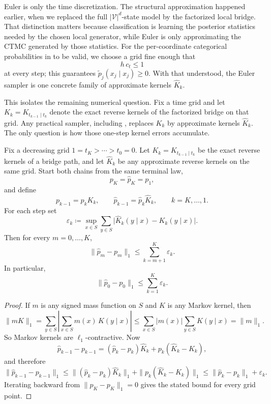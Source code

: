 \documentclass[11pt]{article}
\begin{document}
Euler is only the time discretization.
The structural approximation happened earlier, when we replaced the full \(|\mathcal{V}|^d\)-state model by the factorized local bridge.
That distinction matters because classification is learning the posterior statistics needed by the chosen local generator, while Euler is only approximating the CTMC generated by those statistics.
For the per-coordinate categorical probabilities in  to be valid, we choose a grid fine enough that
\[
  h\,c_t\le 1
\]
at every step; this guarantees \(\tilde p_j(x_j\mid x_j)\ge 0\).
With that understood, the Euler sampler is one concrete family of approximate kernels \(\hat K_k\).

This isolates the remaining numerical question.
Fix a time grid and let \(K_k=K_{t_{k-1}\mid t_k}\) denote the exact reverse kernels of the factorized bridge on that grid.
Any practical sampler, including , replaces \(K_k\) by approximate kernels \(\hat K_k\).
The only question is how those one-step kernel errors accumulate.

\begin{proposition}
\label{prop:accumulated-kernel-error}
Fix a decreasing grid \(1=t_K>\cdots>t_0=0\).
Let \(K_k=K_{t_{k-1}\mid t_k}\) be the exact reverse kernels of a bridge path, and let \(\hat K_k\) be any approximate reverse kernels on the same grid.
Start both chains from the same terminal law,
\[
  p_K=\hat p_K=p_1,
\]
and define
\[
  p_{k-1}=p_k K_k,
  \qquad
  \hat p_{k-1}=\hat p_k \hat K_k,
  \qquad k=K,\dots,1.
\]
For each step set
\[
  \varepsilon_k
  \coloneqq
  \sup_{x\in S}
  \sum_{y\in S}
  \bigl|\hat K_k(y\mid x)-K_k(y\mid x)\bigr|.
\]
Then for every \(m=0,\dots,K\),
\[
  \|\hat p_m-p_m\|_1
  \le
  \sum_{k=m+1}^K \varepsilon_k.
\]
In particular,
\[
  \|\hat p_0-p_0\|_1
  \le
  \sum_{k=1}^K \varepsilon_k.
\]
\end{proposition}
\begin{proof}
If \(m\) is any signed mass function on \(S\) and \(K\) is any Markov kernel, then
\[
  \|mK\|_1
  =
  \sum_{y\in S}
  \left|\sum_{x\in S} m(x)\,K(y\mid x)\right|
  \le
  \sum_{x\in S}|m(x)|\sum_{y\in S}K(y\mid x)
  =
  \|m\|_1.
\]
So Markov kernels are \(\ell_1\)-contractive.
Now
\[
  \hat p_{k-1}-p_{k-1}
  =
  (\hat p_k-p_k)\hat K_k
  +
  p_k(\hat K_k-K_k),
\]
and therefore
\[
  \|\hat p_{k-1}-p_{k-1}\|_1
  \le
  \|(\hat p_k-p_k)\hat K_k\|_1
  +
  \|p_k(\hat K_k-K_k)\|_1
  \le
  \|\hat p_k-p_k\|_1+\varepsilon_k.
\]
Iterating backward from \(\|\hat p_K-p_K\|_1=0\) gives the stated bound for every grid point.%
\end{proof}
\end{document}
